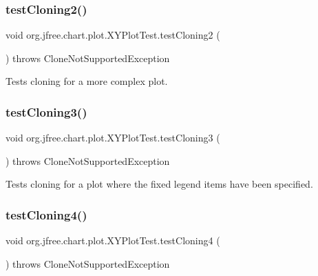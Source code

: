 \subsubsection{\texorpdfstring{test\+Cloning2()}{testCloning2()}}
{\footnotesize\ttfamily void org.\+jfree.\+chart.\+plot.\+X\+Y\+Plot\+Test.\+test\+Cloning2 (\begin{DoxyParamCaption}{ }\end{DoxyParamCaption}) throws Clone\+Not\+Supported\+Exception}

Tests cloning for a more complex plot. \mbox{\label{classorg_1_1jfree_1_1chart_1_1plot_1_1_x_y_plot_test_a848a0072a5efc66e8581372f8ce39ea1}} 
\subsubsection{\texorpdfstring{test\+Cloning3()}{testCloning3()}}
{\footnotesize\ttfamily void org.\+jfree.\+chart.\+plot.\+X\+Y\+Plot\+Test.\+test\+Cloning3 (\begin{DoxyParamCaption}{ }\end{DoxyParamCaption}) throws Clone\+Not\+Supported\+Exception}

Tests cloning for a plot where the fixed legend items have been specified. \mbox{\label{classorg_1_1jfree_1_1chart_1_1plot_1_1_x_y_plot_test_a33e0c630202218a6f1d290bd419cfe8d}} 
\subsubsection{\texorpdfstring{test\+Cloning4()}{testCloning4()}}
{\footnotesize\ttfamily void org.\+jfree.\+chart.\+plot.\+X\+Y\+Plot\+Test.\+test\+Cloning4 (\begin{DoxyParamCaption}{ }\end{DoxyParamCaption}) throws Clone\+Not\+Supported\+Exception}

